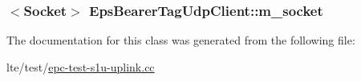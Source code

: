 \subsubsection[{\texorpdfstring{m\+\_\+socket}{m_socket}}]{$<${\bf Socket}$>$ Eps\+Bearer\+Tag\+Udp\+Client\+::m\+\_\+socket\hspace{0.3cm}{\ttfamily [private]}}\hypertarget{classEpsBearerTagUdpClient_a6707bd86336385fc506e8cdeee6f6c9d}{}\label{classEpsBearerTagUdpClient_a6707bd86336385fc506e8cdeee6f6c9d}


The documentation for this class was generated from the following file\+:\begin{DoxyCompactItemize}
\item 
lte/test/\hyperlink{epc-test-s1u-uplink_8cc}{epc-\/test-\/s1u-\/uplink.\+cc}\end{DoxyCompactItemize}
